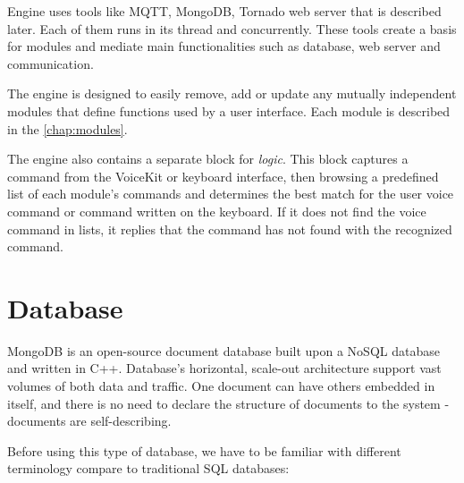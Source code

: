 Engine uses tools like MQTT, MongoDB, Tornado web server that is described later. Each of them runs in its thread and concurrently. These tools create a basis for modules and mediate main functionalities such as database, web server and communication. 

The engine is designed to easily remove, add or update any mutually independent modules that define functions used by a user interface. Each module is described in the \cref{chap:modules}.

The engine also contains a separate block for \textit{logic}. This block captures a command from the VoiceKit or keyboard interface, then browsing a predefined list of each module's commands and determines the best match for the user voice command or command written on the keyboard. If it does not find the voice command in lists, it replies that the command has not found with the recognized command.

\section{Database} \label{section:database}



MongoDB is an open-source document database built upon a NoSQL database and written in C++. Database's horizontal, scale-out architecture support vast volumes of both data and traffic. One document can have others embedded in itself, and there is no need to declare the structure of documents to the system - documents are self-describing.\citep{mongoDB_jayaram_2020}

Before using this type of database, we have to be familiar with different terminology compare to traditional SQL databases: 

